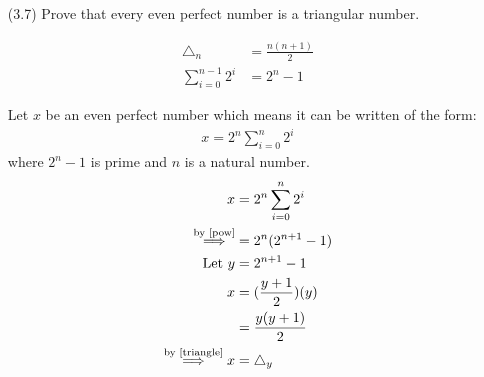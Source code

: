 \begin{enumerate}
\item [(3.7)] Prove that every even perfect number is a triangular number.

\begin{align}
    \triangle_n &= \frac{n(n+1)}{2} \label{triangle} \\
    \sum_{i=0}^{n-1} 2^i &= 2^n - 1 \label{pow}
\end{align}



Let $x$ be an even perfect number which means it can be written of the form:
\begin{align*}
x = 2^n \sum_{i=0}^n 2^i
\end{align*}
where $2^n-1$ is prime and $n$ is a natural number.
\begin{align}
    x &= 2^n \sum_{i=0}^n 2^i \\
    \overset{\text{by \eqref{pow}}}{\Longrightarrow} &= 2^n(2^{n+1} - 1)\\
    \text{Let } y &= 2^{n+1} - 1\\
    x &= (\frac{y+1}{2})(y) \\
    &= \frac{y(y+1)}{2} \\
    \overset{\text{by \eqref{triangle}}}{\Longrightarrow} x &= \triangle_y
\end{align}
\end{enumerate}
